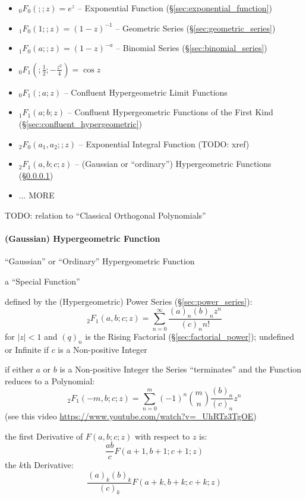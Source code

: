 \begin{itemize}
  \item $_0F_0(;; z) = e^z$ -- Exponential Function
    (\S\ref{sec:exponential_function})
  \item $_1F_0(1;; z) = (1-z)^{-1}$ -- Geometric Series
     (\S\ref{sec:geometric_series})
  \item $_1F_0(a;; z) = (1-z)^{-a}$ -- Binomial Series
    (\S\ref{sec:binomial_series})
  \item $_0F_1(; \frac{1}{2}; -\frac{z^2}{4}) = \cos z$
  \item $_0F_1(; a; z)$ -- Confluent Hypergeometric Limit Functions
  \item $_1F_1(a; b; z)$ -- Confluent Hypergeometric Functions of the First Kind
    (\S\ref{sec:confluent_hypergeometric})
  \item $_2F_0(a_1, a_2; ; z)$ -- Exponential Integral Function (TODO: xref)
  \item $_2F_1(a, b; c; z)$ -- (Gaussian or ``ordinary'') Hypergeometric
    Functions (\S\ref{sec:hypergeometric_function})
  \item ... MORE
\end{itemize}

TODO: relation to ``Classical Orthogonal Polynomials''



\paragraph{(Gaussian) Hypergeometric Function}
\label{sec:hypergeometric_function}\hfill

``Gaussian'' or ``Ordinary'' Hypergeometric Function

a ``Special Function''

defined by the (Hypergeometric) Power Series (\S\ref{sec:power_series}):
\[
  _2F_1 (a, b; c; z) = \sum_{n=0}^\infty \frac{(a)_n (b)_n z^n}{(c)_n n!}
\]
for $|z| < 1$ and $(q)_n$ is the Rising Factorial (\S\ref{sec:factorial_power});
undefined or Infinite if $c$ is a Non-positive Integer

if either $a$ or $b$ is a Non-positive Integer the Series ``terminates'' and the
Function reduces to a Polynomial:
\[
  _2F_1 (-m, b; c; z) = \sum_{n=0}^m (-1)^n \binom{m}{n} \frac{(b)_n}{(c)_n} z^n
\]
(see this video \url{https://www.youtube.com/watch?v=_UhRTz3TgOE})

the first Derivative of $F(a, b; c; z)$ with respect to $z$ is:
\[
  \frac{ab}{c}F(a+1, b+1; c+1; z)
\]
the $k$th Derivative:
\[
  \frac{(a)_k(b)_k}{(c)_k} F(a+k, b+k; c+k; z)
\]

